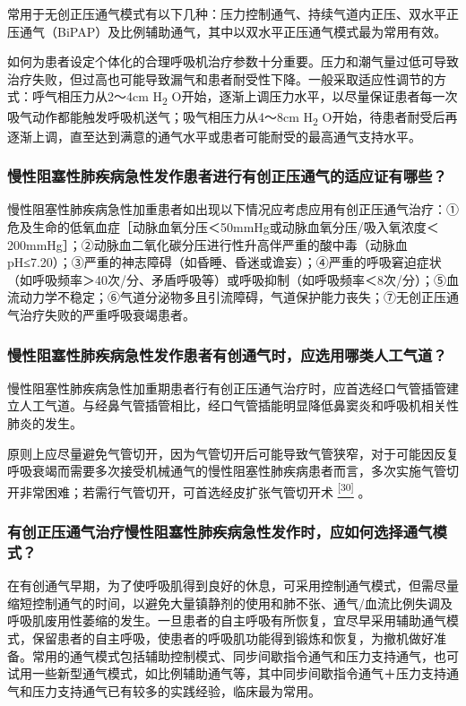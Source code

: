 常用于无创正压通气模式有以下几种：压力控制通气、持续气道内正压、双水平正压通气（BiPAP）及比例辅助通气，其中以双水平正压通气模式最为常用有效。

如何为患者设定个体化的合理呼吸机治疗参数十分重要。压力和潮气量过低可导致治疗失败，但过高也可能导致漏气和患者耐受性下降。一般采取适应性调节的方式：呼气相压力从2～4cm
H\textsubscript{2}
O开始，逐渐上调压力水平，以尽量保证患者每一次吸气动作都能触发呼吸机送气；吸气相压力从4～8cm
H\textsubscript{2}
O开始，待患者耐受后再逐渐上调，直至达到满意的通气水平或患者可能耐受的最高通气支持水平。

\subsubsection{慢性阻塞性肺疾病急性发作患者进行有创正压通气的适应证有哪些？}

慢性阻塞性肺疾病急性加重患者如出现以下情况应考虑应用有创正压通气治疗：①危及生命的低氧血症［动脉血氧分压＜50mmHg或动脉血氧分压/吸入氧浓度＜200mmHg］；②动脉血二氧化碳分压进行性升高伴严重的酸中毒（动脉血pH≤7.20）；③严重的神志障碍（如昏睡、昏迷或谵妄）；④严重的呼吸窘迫症状（如呼吸频率＞40次/分、矛盾呼吸等）或呼吸抑制（如呼吸频率＜8次/分）；⑤血流动力学不稳定；⑥气道分泌物多且引流障碍，气道保护能力丧失；⑦无创正压通气治疗失败的严重呼吸衰竭患者。

\subsubsection{慢性阻塞性肺疾病急性发作患者有创通气时，应选用哪类人工气道？}

慢性阻塞性肺疾病急性加重期患者行有创正压通气治疗时，应首选经口气管插管建立人工气道。与经鼻气管插管相比，经口气管插能明显降低鼻窦炎和呼吸机相关性肺炎的发生。

原则上应尽量避免气管切开，因为气管切开后可能导致气管狭窄，对于可能因反复呼吸衰竭而需要多次接受机械通气的慢性阻塞性肺疾病患者而言，多次实施气管切开非常困难；若需行气管切开，可首选经皮扩张气管切开术
\protect\hyperlink{text00012.htmlux5cux23ch30-11}{\textsuperscript{{[}30{]}}}
。

\subsubsection{有创正压通气治疗慢性阻塞性肺疾病急性发作时，应如何选择通气模式？}

在有创通气早期，为了使呼吸肌得到良好的休息，可采用控制通气模式，但需尽量缩短控制通气的时间，以避免大量镇静剂的使用和肺不张、通气/血流比例失调及呼吸肌废用性萎缩的发生。一旦患者的自主呼吸有所恢复，宜尽早采用辅助通气模式，保留患者的自主呼吸，使患者的呼吸肌功能得到锻炼和恢复，为撤机做好准备。常用的通气模式包括辅助控制模式、同步间歇指令通气和压力支持通气，也可试用一些新型通气模式，如比例辅助通气等，其中同步间歇指令通气＋压力支持通气和压力支持通气已有较多的实践经验，临床最为常用。

